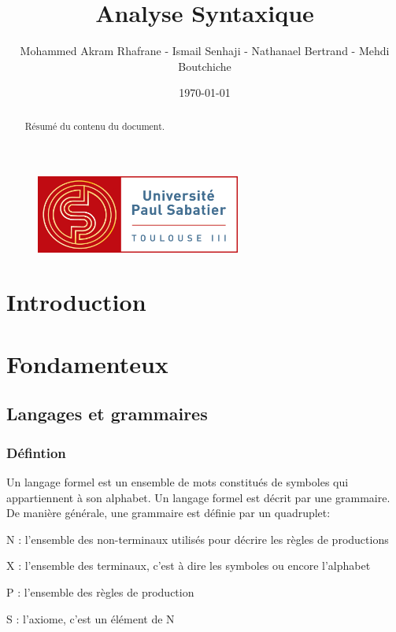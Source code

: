 \documentclass{article}
\title{Analyse Syntaxique}
\author{Mohammed Akram Rhafrane - Ismail Senhaji - Nathanael Bertrand - Mehdi Boutchiche\\}
\date{\today}
\begin{document}
\begin{figure}[t]
	\centering
		\includegraphics[width=0.60\textwidth]{logo-ups.jpg}
	\label{fig:logo-ups}
\end{figure}
\newline
\maketitle

\newpage
\tableofcontents

\newpage
\begin{abstract}
Résumé du contenu du document.
\end{abstract}

\newpage
\section{Introduction}
\label{hints}

\newpage
\section{Fondamenteux}
\label{hints}
\subsection{Langages et grammaires}
\subsubsection{Défintion}
Un langage formel est un ensemble de mots constitués de symboles qui appartiennent à son alphabet.
Un langage formel est décrit par une grammaire.
De manière générale, une grammaire est définie par un quadruplet:

    N : l’ensemble des non-terminaux utilisés pour décrire les règles de productions

    X : l’ensemble des terminaux, c’est à dire les symboles ou encore l’alphabet

    P : l’ensemble des règles de production

    S : l’axiome, c’est un élément de N
\newline
\end{document}
